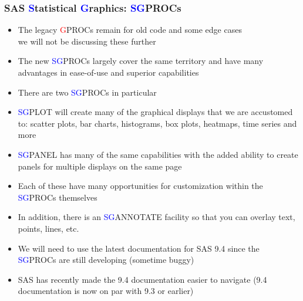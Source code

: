 \documentclass[11pt,pdftex,dvipsnames,usenames,helvetica]{beamer}
\begin{document}
\begin{frame}[fragile]
\frametitle{SAS \textcolor{blue}{S}tatistical \textcolor{blue}{G}raphics:
\textcolor{blue}{SG}PROCs }
\begin{itemize}
\item The legacy \textcolor{red}{G}PROCs remain for old code and some edge cases\\
we will not be discussing these further
\item The new \textcolor{blue}{SG}PROCs largely cover the same
  territory and have many advantages in ease-of-use and superior
  capabilities
\item There are two \textcolor{blue}{SG}PROCs in particular
\item \textcolor{blue}{SG}PLOT will create many of the graphical displays
that we are accustomed to: scatter plots, bar charts, histograms, box plots,
heatmaps, time series and more
\item \textcolor{blue}{SG}PANEL has many of the same capabilities with 
the added ability to create panels for multiple displays on the same page
\item Each of these have many opportunities for customization within the
\textcolor{blue}{SG}PROCs themselves
\item In addition, there is an \textcolor{blue}{SG}ANNOTATE facility
so that you can overlay text, points, lines, etc.
\item We will need to use the latest documentation for SAS 9.4 since
the \textcolor{blue}{SG}PROCs are still developing (sometime buggy)
\item SAS has recently made the 9.4 documentation easier to navigate
(9.4 documentation is now on par with 9.3 or earlier)
\end{itemize}

\end{frame}
\end{document}
